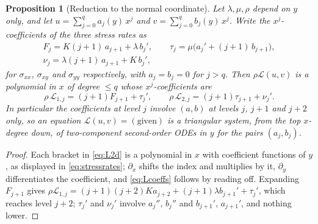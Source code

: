\documentclass[11pt]{amsart}
\newtheorem{proposition}[theorem]{Proposition}
\theoremstyle{definition}
\theoremstyle{remark}
\newcommand{\px}{\partial_x}
\newcommand{\py}{\partial_y}
\begin{document}
\begin{proposition}[Reduction to the normal coordinate]
\label{prop:reduction}
Let $\lambda, \mu, \rho$ depend on $y$ only, and let $u = \sum_{j=0}^{q}
a_j(y)\, x^j$ and $v = \sum_{j=0}^{q} b_j(y)\, x^j$. Write the
$x^j$-coefficients of the three stress rates as
\begin{equation}
  \label{eq:stressrates}
  \begin{gathered}
  F_j = K (j + 1)\, a_{j+1} + \lambda\, b_j', \qquad
  \tau_j = \mu \bigl( a_j' + (j + 1)\, b_{j+1} \bigr), \\
  \nu_j = \lambda (j + 1)\, a_{j+1} + K\, b_j',
  \end{gathered}
\end{equation}
for $\sigma_{xx}$, $\sigma_{xy}$ and $\sigma_{yy}$ respectively, with
$a_j = b_j = 0$ for $j > q$. Then $\rho \mathcal{L}(u, v)$ is a
polynomial in $x$ of degree $\le q$ whose $x^j$-coefficients are
\begin{equation}
  \label{eq:Lcoeffs}
  \rho\, \mathcal{L}_{1, j} = (j + 1) F_{j+1} + \tau_j', \qquad
  \rho\, \mathcal{L}_{2, j} = (j + 1) \tau_{j+1} + \nu_j' .
\end{equation}
In particular the coefficients at level $j$ involve $(a, b)$ at levels
$j$, $j + 1$ and $j + 2$ only, so an equation $\mathcal{L}(u, v) = (\text{given})$
is a triangular system, from the top $x$-degree down, of two-component
second-order ODEs in $y$ for the pairs $(a_j, b_j)$.
\end{proposition}

\begin{proof}
Each bracket in \eqref{eq:L2d} is a polynomial in $x$ with coefficient
functions of $y$, as displayed in \eqref{eq:stressrates}; $\px$ shifts the
index and multiplies by it, $\py$ differentiates the coefficient, and
\eqref{eq:Lcoeffs} follows by reading off. Expanding $F_{j+1}$ gives
$\rho \mathcal{L}_{1,j} = (j + 1)(j + 2) K a_{j+2} + (j + 1) \lambda
b_{j+1}' + \tau_j'$, which reaches level $j + 2$; $\tau_j'$ and $\nu_j'$
involve $a_j''$, $b_j''$ and $b_{j+1}'$, $a_{j+1}'$, and nothing lower.
\end{proof}
\end{document}
